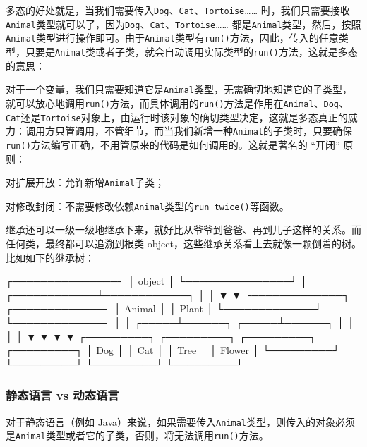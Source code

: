 多态的好处就是，当我们需要传入\texttt{Dog}、\texttt{Cat}、\texttt{Tortoise}\ldots\ldots{}
时，我们只需要接收\texttt{Animal}类型就可以了，因为\texttt{Dog}、\texttt{Cat}、\texttt{Tortoise}\ldots\ldots{}
都是\texttt{Animal}类型，然后，按照\texttt{Animal}类型进行操作即可。由于\texttt{Animal}类型有\texttt{run()}方法，因此，传入的任意类型，只要是\texttt{Animal}类或者子类，就会自动调用实际类型的\texttt{run()}方法，这就是多态的意思：

对于一个变量，我们只需要知道它是\texttt{Animal}类型，无需确切地知道它的子类型，就可以放心地调用\texttt{run()}方法，而具体调用的\texttt{run()}方法是作用在\texttt{Animal}、\texttt{Dog}、\texttt{Cat}还是\texttt{Tortoise}对象上，由运行时该对象的确切类型决定，这就是多态真正的威力：调用方只管调用，不管细节，而当我们新增一种\texttt{Animal}的子类时，只要确保\texttt{run()}方法编写正确，不用管原来的代码是如何调用的。这就是著名的
``开闭'' 原则：

对扩展开放：允许新增\texttt{Animal}子类；

对修改封闭：不需要修改依赖\texttt{Animal}类型的\texttt{run\_twice()}等函数。

继承还可以一级一级地继承下来，就好比从爷爷到爸爸、再到儿子这样的关系。而任何类，最终都可以追溯到根类
object，这些继承关系看上去就像一颗倒着的树。比如如下的继承树：

\begin{pythoncode}
                ┌───────────────┐
                │    object     │
                └───────────────┘
                        │
           ┌────────────┴────────────┐
           │                         │
           ▼                         ▼
    ┌─────────────┐           ┌─────────────┐
    │   Animal    │           │    Plant    │
    └─────────────┘           └─────────────┘
           │                         │
     ┌─────┴──────┐            ┌─────┴──────┐
     │            │            │            │
     ▼            ▼            ▼            ▼
┌─────────┐  ┌─────────┐  ┌─────────┐  ┌─────────┐
│   Dog   │  │   Cat   │  │  Tree   │  │ Flower  │
└─────────┘  └─────────┘  └─────────┘  └─────────┘
\end{pythoncode}

\hypertarget{ux9759ux6001ux8bedux8a00-vs-ux52a8ux6001ux8bedux8a00}{%
\subsubsection{静态语言 vs
动态语言}\label{ux9759ux6001ux8bedux8a00-vs-ux52a8ux6001ux8bedux8a00}}

对于静态语言（例如
Java）来说，如果需要传入\texttt{Animal}类型，则传入的对象必须是\texttt{Animal}类型或者它的子类，否则，将无法调用\texttt{run()}方法。

